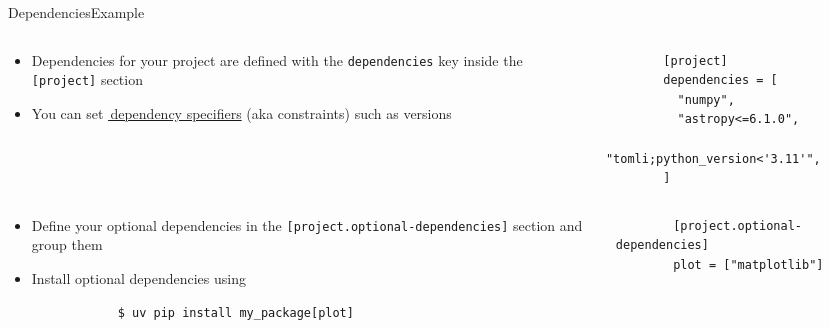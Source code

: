 \begin{splitframe}[fragile]{Dependencies}{Example}
  \begin{columns}[t,onlytextwidth]
    \begin{column}{0.58\textwidth}
      \begin{itemize}
        \setlength{\itemsep}{1em}
        \item Dependencies for your project are defined with the \texttt{dependencies}
          key inside the \texttt{[project]} section
        \item You can set \href{https://packaging.python.org/en/latest/specifications/dependency-specifiers/}{{\footnotesize{\faExternalLink*}}\,dependency specifiers}
          (aka constraints) such as versions
      \end{itemize}
    \end{column}
    \hfill
    \begin{column}{0.38\textwidth}
      \begin{verbatim}
        [project]
        dependencies = [
          "numpy",
          "astropy<=6.1.0",
          "tomli;python_version<'3.11'",
        ]
      \end{verbatim}
    \end{column}
  \end{columns}
  \vspace{1em}
  \begin{columns}[t,onlytextwidth]
    \begin{column}{0.58\textwidth}
      \begin{itemize}
        \setlength{\itemsep}{1em}
        \item Define your optional dependencies in the \texttt{[project.optional-dependencies]} section
          and group them
        \item Install optional dependencies using
          \begin{verbatim}
            $ uv pip install my_package[plot]
          \end{verbatim}
      \end{itemize}
    \end{column}
    \hfill
    \begin{column}{0.38\textwidth}
      \begin{verbatim}
        [project.optional-dependencies]
        plot = ["matplotlib"]
      \end{verbatim}
    \end{column}
  \end{columns}

\end{splitframe}

